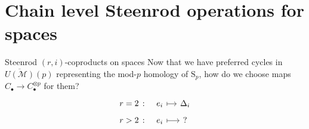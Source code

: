 \documentclass[10pt,t]{beamer} %
\renewcommand{\S}{\mathrm{S}}
\newcommand{\M}{\overline{U(\mathcal M)}}
\begin{document}
\section{Chain level Steenrod operations for spaces}

\begin{frame}[fragile]{Steenrod $(r,i)$-coproducts on spaces}
	Now that we have preferred cycles in $\M(p)$ representing the mod-$p$ homology of $\S_p$, how do we choose maps $C_\bullet \to C_\bullet^{\otimes p}$ for them?
	\begin{equation*}
	\begin{tikzcd}[column sep=small, row sep=tiny]
	r = 2 \ \colon &[-10pt] e_i \arrow[r, |->] & \Delta_i \\
	r > 2 \ \colon & e_i \arrow[r, |->] & ?
	\end{tikzcd}
	\end{equation*}
	
	\pause
	

\end{frame}
\end{document}
